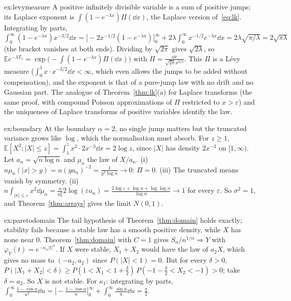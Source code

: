 \begin{solution}{ex:levymeasure}
\idea A positive infinitely divisible variable is a sum of positive jumps; its Laplace exponent is $\int(1-e^{-\lambda x})\Pi(\dd x)$, the Laplace version of~\eqref{eq:lk}.
\writeup Integrating by parts, $\int_0^\infty(1-e^{-\lambda x})x^{-3/2}\dd x=\bigl[-2x^{-1/2}(1-e^{-\lambda x})\bigr]_0^\infty+2\lambda\int_0^\infty x^{-1/2}e^{-\lambda x}\dd x=2\lambda\sqrt{\pi/\lambda}=2\sqrt{\pi\lambda}$
(the bracket vanishes at both ends). Dividing by $\sqrt{2\pi}$ gives $\sqrt{2\lambda}$, so $\mathbb Ee^{-\lambda T_1}=\exp\bigl(-\int(1-e^{-\lambda x})\Pi(\dd x)\bigr)$ with $\Pi=\frac{\dd x}{\sqrt{2\pi}x^{3/2}}$.
This $\Pi$ is a L\'evy measure ($\int_0^1x\cdot x^{-3/2}\dd x<\infty$, which even allows the jumps to be added without compensation), and the exponent is that of a
pure-jump law with no drift and no Gaussian part. The analogue of Theorem~\ref{thm:lk}(a) for Laplace transforms (the same proof, with compound Poisson
approximations of $\Pi$ restricted to $x>\varepsilon$) and the uniqueness of Laplace transforms of positive variables identify the law.
\end{solution}

\begin{solution}{ex:boundary}
\idea At the boundary $\alpha=2$, no single jump matters but the truncated variance grows like $\log$, which the normalisation must absorb.
\writeup For $z\ge1$, $\mathbb E[X^2;|X|\le z]=\int_1^zx^2\cdot2x^{-3}\dd x=2\log z$, since $|X|$ has density $2x^{-3}$ on $[1,\infty)$. Let $a_n=\sqrt{n\log n}$ and $\mu_n$ the law of
$X/a_n$. (i) $n\mu_n(|x|>y)=n(ya_n)^{-2}=\frac1{y^2\log n}\to0$: $\Pi=0$. (iii) The truncated means vanish by symmetry. (ii)
$n\int_{|x|\le\varepsilon}x^2\dd\mu_n=\frac n{a_n^2}2\log(\varepsilon a_n)=\frac{2\log\varepsilon+\log n+\log\log n}{\log n}\to1$ for every $\varepsilon$. So $\sigma^2=1$, and
Theorem~\ref{thm:arrays} gives the limit $N(0,1)$.
\end{solution}

\begin{solution}{ex:paretodomain}
\idea The tail hypothesis of Theorem~\ref{thm:domain} holds exactly; stability fails because a stable law has a smooth positive density, while $X$ has none
near $0$.
\writeup Theorem~\ref{thm:domain} with $C=1$ gives $S_n/n^{1/\alpha}\Rightarrow Y$ with $\varphi_Y(t)=e^{-\kappa_\alpha|t|^\alpha}$. If $X$ were stable, $X_1+X_2$ would have the law of
$a_2X$, which gives no mass to $(-a_2,a_2)$ since $P(|X|<1)=0$. But for every $\delta>0$,
$P(|X_1+X_2|<\delta)\ge P(1<X_1<1+\frac\delta2)\,P(-1-\frac\delta2<X_2<-1)>0$; take $\delta=a_2$. So $X$ is not stable. For $\kappa_1$: integrating by parts,
$\int_0^\infty\frac{1-\cos u}{u^2}\dd u=\bigl[-\frac{1-\cos u}u\bigr]_0^\infty+\int_0^\infty\frac{\sin u}u\dd u=\frac\pi2$.
\end{solution}

